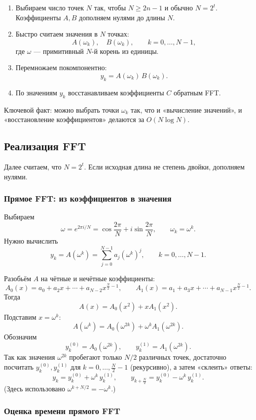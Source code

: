 \begin{enumerate}
	\item Выбираем число точек $N$ так, чтобы $N\ge 2n-1$ и обычно $N=2^t$.
	Коэффициенты $A,B$ дополняем нулями до длины $N$.
	\item Быстро считаем значения в $N$ точках:
	\[
	A(\omega_k),\quad B(\omega_k), \qquad k=0,\dots,N-1,
	\]
	где $\omega$ — примитивный $N$-й корень из единицы.
	\item Перемножаем покомпонентно:
	\[
	y_k = A(\omega_k)\,B(\omega_k).
	\]
	\item По значениям $y_k$ восстанавливаем коэффициенты $C$ обратным FFT.
\end{enumerate}

Ключевой факт: можно выбрать точки $\omega_k$ так, что и «вычисление значений»,
и «восстановление коэффициентов» делаются за $O(N\log N)$.

\subsection*{Реализация FFT}

Далее считаем, что $N=2^t$. Если исходная длина не степень двойки,
дополняем нулями.

\subsubsection*{Прямое FFT: из коэффициентов в значения}

Выбираем
\[
\omega = e^{2\pi i/N}=\cos\frac{2\pi}{N}+i\sin\frac{2\pi}{N},
\qquad
\omega_k=\omega^k.
\]
Нужно вычислить
\[
y_k = A(\omega^k)=\sum_{j=0}^{N-1} a_j(\omega^k)^j,\qquad k=0,\dots,N-1.
\]

Разобьём $A$ на чётные и нечётные коэффициенты:
\[
A_0(x)=a_0+a_2x+\cdots+a_{N-2}x^{\frac{N}{2}-1},
\qquad
A_1(x)=a_1+a_3x+\cdots+a_{N-1}x^{\frac{N}{2}-1}.
\]
Тогда
\[
A(x)=A_0(x^2)+xA_1(x^2).
\]
Подставим $x=\omega^k$:
\[
A(\omega^k)=A_0(\omega^{2k})+\omega^k A_1(\omega^{2k}).
\]
Обозначим
\[
y_k^{(0)}=A_0(\omega^{2k}),\qquad y_k^{(1)}=A_1(\omega^{2k}).
\]
Так как значения $\omega^{2k}$ пробегают только $N/2$ различных точек,
достаточно посчитать $y_k^{(0)},y_k^{(1)}$ для $k=0,\dots,\frac{N}{2}-1$ (рекурсивно),
а затем «склеить» ответы:
\[
y_k = y_k^{(0)} + \omega^k\, y_k^{(1)},
\qquad
y_{k+\frac{N}{2}} = y_k^{(0)} - \omega^k\, y_k^{(1)}.
\]
(Здесь использовано $\omega^{k+N/2}=-\omega^k$.)

\subsubsection*{Оценка времени прямого FFT}

